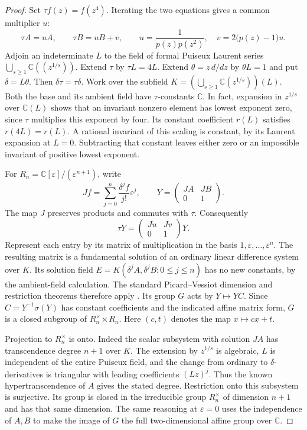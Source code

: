 \documentclass[11pt,a4paper]{article}
\theoremstyle{definition}
\theoremstyle{remark}
\numberwithin{equation}{section}
\begin{document}
\begin{proof}
Set $\tau f(z)=f(z^4)$. Iterating the two equations gives a common
multiplier $u$:
\[
 \tau A=uA,\qquad \tau B=uB+v,\qquad
 u=\frac{1}{p(z)p(z^2)},\quad v=2\bigl(p(z)-1\bigr)u.
\]
Adjoin an indeterminate $L$ to the field of formal Puiseux Laurent
series $\bigcup_{s\ge1}\mathbb C((z^{1/s}))$. Extend $\tau$ by
$\tau L=4L$. Extend $\theta=z\,d/dz$ by $\theta L=1$ and put
$\delta=L\theta$. Then $\delta\tau=\tau\delta$. Work over the subfield
$K=(\bigcup_{s\ge1}\mathbb C(z^{1/s}))(L)$. Both the base and its
ambient field have $\tau$-constants $\mathbb C$. In fact, expansion
in $z^{1/s}$ over $\mathbb C(L)$ shows that an invariant nonzero
element has lowest exponent zero, since $\tau$ multiplies this exponent
by four. Its constant coefficient $r(L)$ satisfies $r(4L)=r(L)$.
A rational invariant of this scaling is constant, by its Laurent
expansion at $L=0$. Subtracting that constant leaves either zero or an
impossible invariant of positive lowest exponent.

For $R_n=\mathbb C[\varepsilon]/(\varepsilon^{n+1})$, write
\[
 Jf=\sum_{j=0}^n\frac{\delta^j f}{j!}\varepsilon^j,\qquad
 Y=\begin{pmatrix} JA&JB\\0&1\end{pmatrix}.
\]
The map $J$ preserves products and commutes with $\tau$. Consequently
\[
 \tau Y=\begin{pmatrix}Ju&Jv\\0&1\end{pmatrix}Y.
\]
Represent each entry by its matrix of multiplication in the basis
$1,\varepsilon,\ldots,\varepsilon^n$. The resulting matrix is a
fundamental solution of an ordinary linear difference system over $K$.
Its solution field $E=K(\delta^j A,\delta^j B:0\le j\le n)$ has no
new constants, by the ambient-field calculation. The standard
Picard--Vessiot dimension and restriction theorems therefore apply
\cite[\S1]{dsdhr}. Its group $G$ acts by $Y\mapsto YC$.
Since $C=Y^{-1}\sigma(Y)$ has constant coefficients and the
indicated affine matrix form, $G$ is a closed subgroup of
$R_n^\times\ltimes R_n$. Here $(c,t)$ denotes the map $x\mapsto cx+t$.

Projection to $R_n^\times$ is onto. Indeed the scalar subsystem with
solution $JA$ has transcendence degree $n+1$ over $K$. The extension
by $z^{1/s}$ is algebraic, $L$ is independent of the entire Puiseux
field, and the change from ordinary to $\delta$-derivatives is triangular
with leading coefficients $(Lz)^j$. Thus the known hypertranscendence
of $A$ gives the stated degree. Restriction onto this subsystem is
surjective. Its group is closed in the irreducible group $R_n^\times$
of dimension $n+1$ and has that same dimension. The same reasoning at
$\varepsilon=0$ uses the independence of $A,B$ to make the image of
$G$ the full two-dimensional affine group over $\mathbb C$.


\end{proof}
\end{document}
